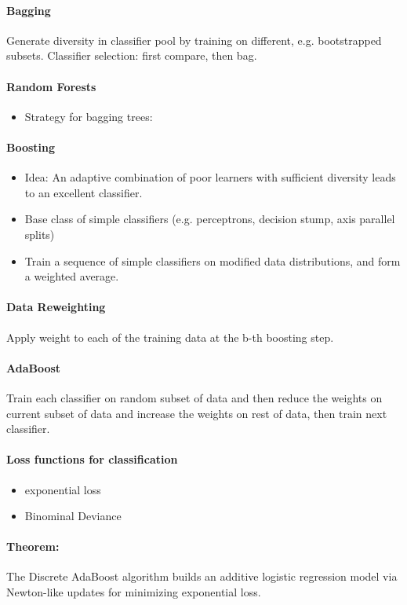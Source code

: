 \paragraph{Bagging}
Generate diversity in classifier pool by training on different, e.g. bootstrapped subsets. Classifier selection: first compare, then bag.

\paragraph{Random Forests}
\begin{itemize}
    \item Strategy for bagging trees: 
\end{itemize}{}

\paragraph{Boosting}
\begin{itemize}
    \item Idea: An adaptive combination of poor learners with sufficient diversity leads to an excellent classifier.
    \item Base class of simple classifiers (e.g. perceptrons, decision stump, axis parallel splits)
    \item Train a sequence of simple classifiers on modified data distributions, and form a weighted average.
\end{itemize}{}

\paragraph{Data Reweighting}
Apply weight to each of the training data at the b-th boosting step.

\paragraph{AdaBoost}
Train each classifier on random subset of data and then reduce the weights on current subset of data and increase the weights on rest of data, then train next classifier.

\paragraph{Loss functions for classification}
\begin{itemize}
    \item exponential loss
    \item Binominal Deviance
\end{itemize}{}

\paragraph{Theorem: }The Discrete AdaBoost algorithm builds an additive logistic regression model via Newton-like updates for minimizing exponential loss.